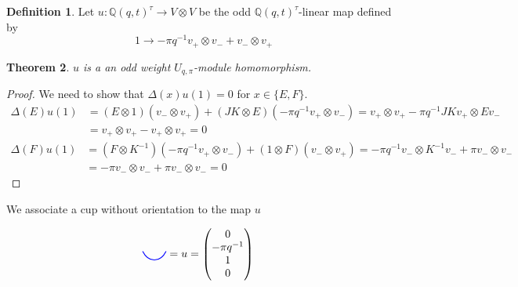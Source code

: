 \documentclass{amsart}
\newcommand{\hackcenter}[1]{
 \xy (0,0)*{#1}; \endxy}
\def\Q{\mathsf{Q}}
\theoremstyle{plain}
\newtheorem{theorem}{Theorem}
\theoremstyle{definition}
\newtheorem{definition}[theorem]{Definition}
\theoremstyle{definition}
\numberwithin{equation}{section}
\numberwithin{theorem}{section}
\renewcommand{\to}{\rightarrow}
\def\Q{\mathbb{Q}}
\numberwithin{equation}{section}
\begin{document}

\begin{definition}
  Let $u:\Q(q,t)^\tau \to V \otimes V$ be the odd $\Q(q,t)^\tau$-linear map defined by
  \[
  1\to -\pi q^{-1}v_+ \otimes v_{-} + v_{-}\otimes v_{+}
  \]
\end{definition}

\begin{theorem}
  $u$ is a an odd weight $U_{q,\pi}$-module homomorphism.
\end{theorem}
\begin{proof}
  We need to show that $\Delta(x)u(1)=0$ for $x\in \{E,F\}$.
  \begin{align*}
    \Delta(E)u(1)&=(E\otimes 1)(v_{-}\otimes v_{+})+(JK \otimes E)(-\pi q^{-1}v_+ \otimes v_{-})=v_+\otimes v_+ -\pi q^{-1} JKv_+ \otimes Ev_-\\
    &=v_+\otimes v_+ -v_+\otimes v_+=0
  \end{align*}
  \begin{align*}
    \Delta(F)u(1)&=(F\otimes K^{-1})(-\pi q^{-1}v_+ \otimes v_{-})+(1\otimes F)(v_-\otimes v_+)=-\pi q^{-1}v_-\otimes K^{-1}v_-+\pi v_-\otimes v_- \\
    &=-\pi v_-\otimes v_- +\pi v_- \otimes v_-=0
  \end{align*}
\end{proof}

We associate a cup without orientation to the map $u$

\begin{align}\label{blue-cup-draw}
  \hackcenter{ \begin{tikzpicture} [scale=.75]
\draw[thick,   blue, -] (0,1).. controls ++(.25,-.5) and ++(-.25,-.5).. (1,1);
\end{tikzpicture}} & = u =
\begin{pmatrix}
     0\\
     -\pi q^{-1}\\
     1 \\
     0
  \end{pmatrix}
\end{align}
\end{document}
